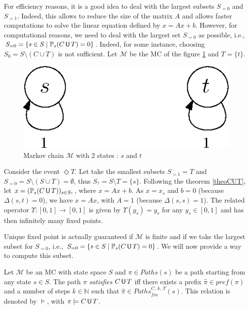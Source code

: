 \begin{remark}[\textit{Choosing $S_{=0}$ and $S_{=1}$}]\label{remarkS0S1}
For efficiency reasons, it is a good idea to deal with the largest subsets $S_{=0}$ and $S_{=1}$. Indeed, this allows to reduce
the size of the matrix $A$ and allows faster computations to solve the linear equation defined by $x = Ax + b$.
However, for computational reasons, we need to deal with the largest set $S_{=0}$ as possible, i.e., $S_{=0} = \{ s \in S \; | \; \mathbb{P}_s(C \,\text{\sffamily U}\, T) = 0 \}$. Indeed, for some instance, choosing $S_0 = S \setminus (C \cup T)$ is not sufficient.
Let $\mathcal{M}$ be the MC of the figure \ref{s0s1} and $T = \{t\}$.
\begin{figure}[h]
  \centering
  \includegraphics[width=0.3\linewidth]{resources/S0S1}
  \caption{Markov chain $\mathcal{M}$ with $2$ states : $s$ and $t$}\label{s0s1}
\end{figure}
Consider the event $\Diamond T$. Let take the smallest subsets $S_{=1} = T$ and $S_{=0} = S \setminus (S \cup T) = \emptyset$, thus $S_? = S \setminus T = \{s\}$. Following the theorem \ref{theoCUT}, let $x = (\mathbb{P}_s(C \,\text{\sffamily U}\, T))_{s \in S_?}$, where $x = Ax+b$. As $x=x_s$ and $b = 0$ (because $\Delta(s, t) = 0$),
we have $x = Ax$, with $A = 1$ (because $\Delta(s, s) = 1$). The related operator $\Upsilon:[0, 1] \rightarrow [0,1]$ is given by $\Upsilon(y_s) = y_s$ for any $y_s \in [0, 1]$ and has then infinitely many fixed points.
\end{remark}
Unique fixed point is actually guaranteed if $\mathcal{M}$ is finite and if we take the largest subset for $S_{=0}$, i.e., $S_{=0}=\{s \in S \; | \; \mathbb{P}_s(C \,\text{\sffamily U}\, T) =0 \}$. We will now provide a way to compute this subset.
\begin{definition}
Let $\mathcal{M}$ be an MC with state space $S$ and $\pi \in Paths(s)$ be a path starting from any state $s \in S$. The path $\pi$ \textit{satisfies} $C \,\text{\sffamily U}\, T$ iff there exists a prefix $\hat{\pi}\in pref(\pi)$ and a number of steps $k \in \mathbb{N}$ such that $\hat{\pi} \in Paths_{fin}^{C,\, k,\, T}(s)$. This relation is denoted by $\models$, with $\pi \models C \,\text{\sffamily U}\, T$.
\end{definition}
